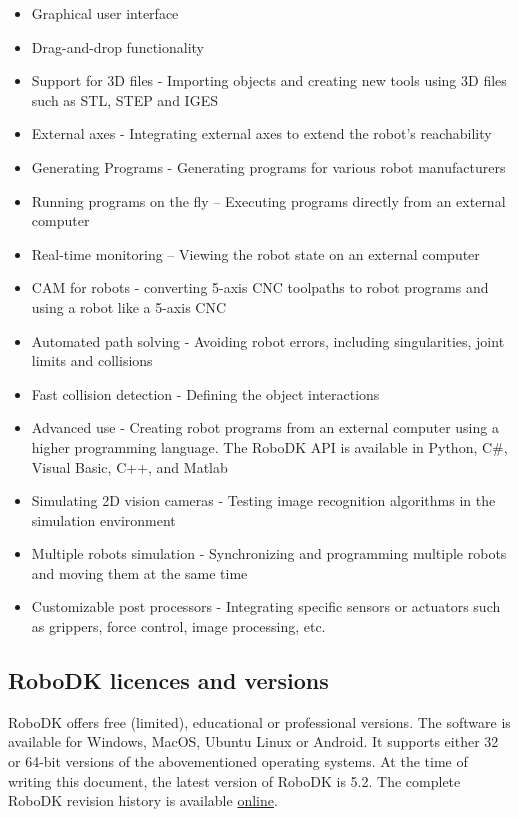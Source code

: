 \begin{itemize}
\item Graphical user interface
\item Drag-and-drop functionality 
\item Support for 3D files - Importing objects and creating new tools using 3D files such as STL, STEP and IGES
\item External axes - Integrating external axes to extend the robot’s reachability
\item Generating Programs - Generating programs for various robot manufacturers
\item Running programs on the fly – Executing programs directly from an external computer
\item Real-time monitoring – Viewing the robot state on an external computer 
\item CAM for robots - converting 5-axis CNC toolpaths to robot programs and using a robot like a 5-axis CNC
\item Automated path solving - Avoiding robot errors, including singularities, joint limits and collisions
\item Fast collision detection - Defining the object interactions 
\item Advanced use - Creating robot programs from an external computer using a higher programming language. The RoboDK API is available in Python, C#, Visual Basic, C++, and Matlab
\item Simulating 2D vision cameras - Testing image recognition algorithms in the simulation environment
\item Multiple robots simulation - Synchronizing and programming multiple robots and moving them at the same time 
\item Customizable post processors - Integrating specific sensors or actuators such as grippers, force control, image processing, etc.
\end{itemize}

\subsection{RoboDK licences and versions}

RoboDK offers free (limited), educational or professional versions. 
The software is available for Windows, MacOS, Ubuntu Linux or Android. It supports either 32 or 64-bit versions of the abovementioned operating systems. At the time of writing this document, the latest version of RoboDK is 5.2. The complete RoboDK revision history is available \href{https://robodk.com/whatsnew}{online}. 

